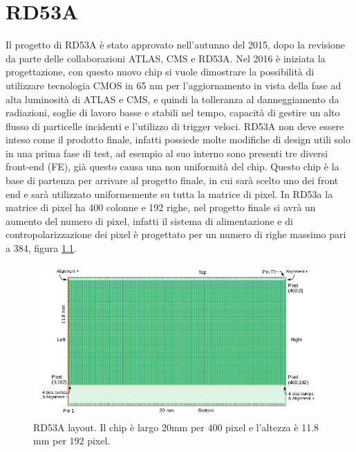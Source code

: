 \chapter{RD53A}

Il progetto di RD53A è stato approvato nell'autunno del 2015, dopo la revisione da parte delle collaborazioni ATLAS, CMS e RD53A. Nel 2016 è iniziata la progettazione, con questo nuovo chip si vuole dimostrare la possibilità di utilizzare tecnologia CMOS  in 65 nm per l'aggiornamento in vista della fase ad alta luminosità di ATLAS e CMS, e quindi la tolleranza al danneggiamento da radiazioni, soglie di lavoro basse e stabili nel tempo, capacità di gestire un alto flusso di particelle incidenti e l'utilizzo di trigger veloci. 
RD53A non deve essere inteso come il prodotto finale, infatti possiede molte modifiche di design utili solo in una prima fase di test, ad esempio al suo interno sono presenti tre diversi front-end (FE), già questo causa una non uniformità del chip. 
Questo chip è la base di partenza per arrivare al progetto finale, in cui sarà scelto uno dei front end e sarà utilizzato uniformemente su tutta la matrice di pixel. In RD53a la matrice di pixel ha 400 colonne e 192 righe, nel progetto finale si avrà un aumento del numero di pixel, infatti il sistema di alimentazione e di contropolarizzazione dei pixel è progettato per un numero di righe massimo pari a 384, figura \ref{RD53ALayout}.
\begin{figure}
\centering
\includegraphics[scale=.4]{Immagini/RD53ALayout}
\caption{RD53A layout. Il chip è largo 20mm per 400 pixel e l'altezza è 11.8 mm per 192 pixel.}
\label{RD53ALayout}
\end{figure}

